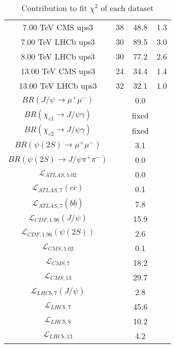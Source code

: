 \begin{table}[h!]
\begin{tabular}{c|c|c|c}
7.00 TeV CMS ups3 & 38 & 48.8 & 1.3 \\
7.00 TeV LHCb ups3 & 30 & 89.5 & 3.0 \\
8.00 TeV LHCb ups3 & 30 & 77.2 & 2.6 \\
13.00 TeV CMS ups3 & 24 & 34.4 & 1.4 \\
13.00 TeV LHCb ups3 & 32 & 32.1 & 1.0 \\
\hline
$BR(J/\psi\rightarrow\mu^+\mu^-)$ &  & 0.0 &  \\
$BR(\chi_{c1}\rightarrow J/\psi\gamma)$ &  & fixed & \\
$BR(\chi_{c2}\rightarrow J/\psi\gamma)$ &  & fixed & \\
$BR(\psi(2S)\rightarrow\mu^+\mu^-)$ &  & 3.1 &  \\
$BR(\psi(2S)\rightarrow J/\psi\pi^+\pi^-)$ &  & 0.0 &  \\
$\mathcal L_{ATLAS,5.02}$ &  & 0.0 &  \\
$\mathcal L_{ATLAS,7}(c\overline c)$ &  & 0.1 &  \\
$\mathcal L_{ATLAS,7}(b\overline b)$ &  & 7.8 &  \\
$\mathcal L_{CDF,1.96}(J/\psi)$ &  & 15.9 &  \\
$\mathcal L_{CDF,1.96}(\psi(2S))$ &  & 2.6 &  \\
$\mathcal L_{CMS,5.02}$ &  & 0.1 &  \\
$\mathcal L_{CMS,7}$ &  & 18.2 &  \\
$\mathcal L_{CMS,13}$ &  & 29.7 &  \\
$\mathcal L_{LHCb,7}(J/\psi)$ &  & 2.8 &  \\
$\mathcal L_{LHCb,7}$ &  & 45.6 &  \\
$\mathcal L_{LHCb,8}$ &  & 10.2 &  \\
$\mathcal L_{LHCb,13}$ &  & 4.2 &  \\
\end{tabular}
\caption{Contribution to fit $\chi^2$ of each dataset}
\end{table}
